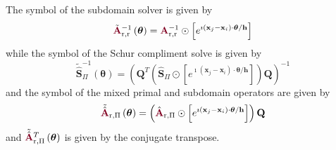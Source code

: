 \begin{definition}
The symbol of the subdomain solver is given by
\begin{equation}
\tilde{\color{burgundy}\mathbf{A}}_{\text{r}, \text{r}}^{-1} \left( \boldsymbol{\theta} \right) = {\color{burgundy}\mathbf{A}}_{\text{r}, \text{r}}^{-1} \odot \left[ e^{\imath \left( \mathbf{x}_j - \mathbf{x}_i \right) \cdot \boldsymbol{\theta} / \mathbf{h}} \right]
\end{equation}
while the symbol of the Schur compliment solve is given by
\begin{equation}
\tilde{\hat{\mathbf{S}}}_{\Pi}^{-1} \left( \boldsymbol{\theta} \right) = \left( \mathbf{Q}^T \left( \hat{\mathbf{S}}_{\Pi} \odot \left[ e^{\imath \left( \mathbf{x}_j - \mathbf{x}_i \right) \cdot \boldsymbol{\theta} / \mathbf{h}} \right] \right) \mathbf{Q} \right)^{-1}
\end{equation}
and the symbol of the mixed primal and subdomain operators are given by
\begin{equation}
\tilde{\hat{\color{burgundy}\mathbf{A}}}\color{black}_{\text{r}, \Pi} \left( \boldsymbol{\theta} \right) = \left( \hat{\color{burgundy}\mathbf{A}}_{\text{r}, \Pi} \odot \left[ e^{\imath \left( \mathbf{x}_j - \mathbf{x}_i \right) \cdot \boldsymbol{\theta} / \mathbf{h}} \right] \right) \mathbf{Q}
\end{equation}
and $\tilde{\hat{\color{burgundy}\mathbf{A}}}\color{black}_{\text{r}, \Pi}^T \left( \boldsymbol{\theta} \right)$ is given by the conjugate transpose.
\label{def:subassembled_symbol}
\end{definition}

